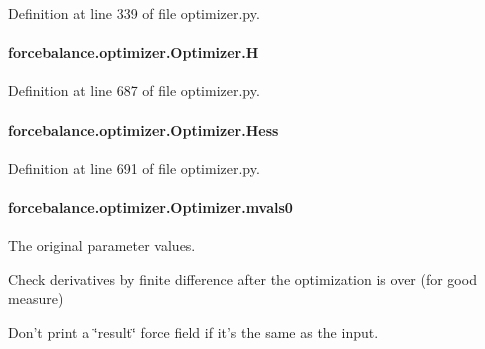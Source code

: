 Definition at line 339 of file optimizer.\-py.

\hypertarget{classforcebalance_1_1optimizer_1_1Optimizer_a7cf404b3b15afec4237344f09a31b6c7}{
\paragraph[{H}]{\setlength{\rightskip}{0pt plus 5cm}forcebalance.\-optimizer.\-Optimizer.\-H}}\label{classforcebalance_1_1optimizer_1_1Optimizer_a7cf404b3b15afec4237344f09a31b6c7}


Definition at line 687 of file optimizer.\-py.

\hypertarget{classforcebalance_1_1optimizer_1_1Optimizer_ab99276420d1c28932d2559c7f8e88922}{
\paragraph[{Hess}]{\setlength{\rightskip}{0pt plus 5cm}forcebalance.\-optimizer.\-Optimizer.\-Hess}}\label{classforcebalance_1_1optimizer_1_1Optimizer_ab99276420d1c28932d2559c7f8e88922}


Definition at line 691 of file optimizer.\-py.

\hypertarget{classforcebalance_1_1optimizer_1_1Optimizer_aa1d7f33ea1c9341fb1c867ef01752a16}{
\paragraph[{mvals0}]{\setlength{\rightskip}{0pt plus 5cm}forcebalance.\-optimizer.\-Optimizer.\-mvals0}}\label{classforcebalance_1_1optimizer_1_1Optimizer_aa1d7f33ea1c9341fb1c867ef01752a16}


The original parameter values. 

Check derivatives by finite difference after the optimization is over (for good measure)

Don't print a \char`\"{}result\char`\"{} force field if it's the same as the input.

